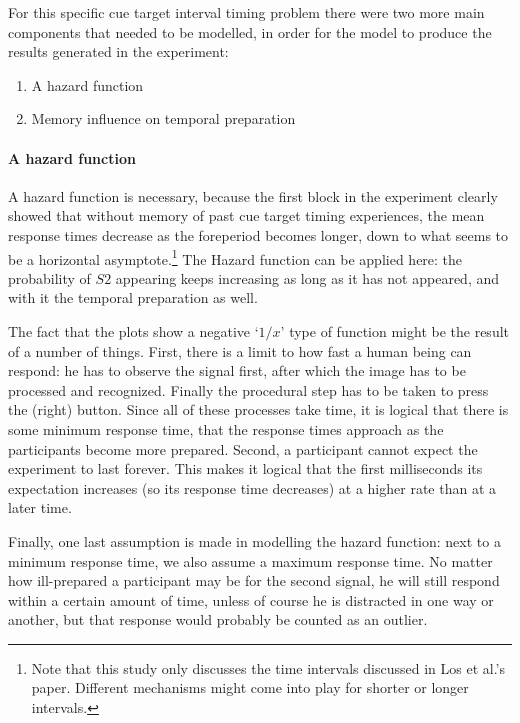 \documentclass[10pt,letterpaper]{article}
\begin{document}
For this specific cue target interval timing problem there were two more main components that needed to be modelled, in order for the model to produce the results generated in the experiment:
\begin{enumerate}
	\item A hazard function
	\item Memory influence on temporal preparation
\end{enumerate}

\paragraph{A hazard function}
A hazard function is necessary, because the first block in the experiment clearly showed that without memory of past cue target timing experiences, the mean response times decrease as the foreperiod becomes longer, down to what seems to be a horizontal asymptote.\footnote{Note that this study only discusses the time intervals discussed in Los et al.'s paper. Different mechanisms might come into play for shorter or longer intervals.} The Hazard function can be applied here: the probability of $S2$ appearing keeps increasing as long as it has not appeared, and with it the temporal preparation as well. 

The fact that the plots show a negative `$1/x$' type of function might be the result of a number of things. First, there is a limit to how fast a human being can respond: he has to observe the signal first, after which the image has to be processed and recognized. Finally the procedural step has to be taken to press the (right) button. Since all of these processes take time, it is logical that there is some minimum response time, that the response times approach as the participants become more prepared. Second, a participant cannot expect the experiment to last forever. This makes it logical that the first milliseconds its expectation increases (so its response time decreases) at a higher rate than at a later time. 

Finally, one last assumption is made in modelling the hazard function: next to a minimum response time, we also assume a maximum response time. No matter how ill-prepared a participant may be for the second signal, he will still respond within a certain amount of time, unless of course he is distracted in one way or another, but that response would probably be counted as an outlier.
\end{document}
